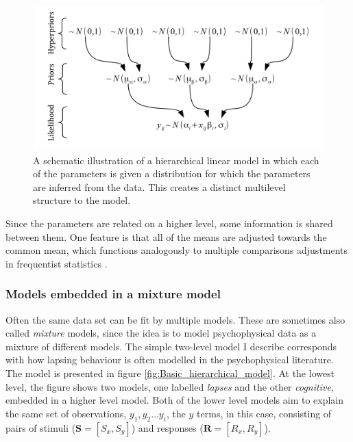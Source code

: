 \documentclass{article}\usepackage{knitr}
\begin{document}
\begin{figure}[!htb]
\includegraphics{Hierarchical_model_for_groups}
\caption{A schematic illustration of a hierarchical linear model in which each of the parameters is given a distribution for which the parameters are inferred from the data. This creates a distinct multilevel structure to the model.}
\label{fig:hierarchical_model_for_groups}
\end{figure}

Since the parameters are related on a higher level, some information is shared between them. One feature is that all of the means are adjusted towards the common mean, which functions analogously to multiple comparisons adjustments in frequentist statistics \citep{gelman2012}. 

\subsubsection*{Models embedded in a mixture model} 

Often the same data set can be fit by multiple models. These are sometimes also called \textit{mixture} models, since the idea is to model psychophysical data as a mixture of different models. The simple two-level model I describe corresponds with how lapsing behaviour is often modelled in the psychophysical literature. The model is presented in figure \ref{fig:Basic_hierarchical_model}. At the lowest level, the figure shows two models, one labelled \textit{lapses} and the other \textit{cognitive}, embedded in a higher level model. Both of the lower level models aim to explain the same set of observations, $y_1, y_2 \dots y_i$, the $y$ terms, in this case, consisting of pairs of stimuli ($\bm{S} = [S_x, S_y]$) and responses ($\bm{R} = [R_x, R_y]$). 
\end{document}
